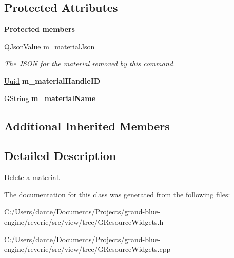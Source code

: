 \subsection*{Protected Attributes}
\begin{Indent}\textbf{ Protected members}\par
\begin{DoxyCompactItemize}
\item 
\mbox{\label{classrev_1_1_delete_material_command_a8ec58d542cc2692e4de29fd7f6003577}} 
Q\+Json\+Value \mbox{\hyperlink{classrev_1_1_delete_material_command_a8ec58d542cc2692e4de29fd7f6003577}{m\+\_\+material\+Json}}
\begin{DoxyCompactList}\small\item\em The J\+S\+ON for the material removed by this command. \end{DoxyCompactList}\item 
\mbox{\label{classrev_1_1_delete_material_command_a3a77dfb478ac09b3854703185af647e9}} 
\mbox{\hyperlink{classrev_1_1_uuid}{Uuid}} {\bfseries m\+\_\+material\+Handle\+ID}
\item 
\mbox{\label{classrev_1_1_delete_material_command_ac6d99f6c1402426de1770ff2e5aae688}} 
\mbox{\hyperlink{classrev_1_1_g_string}{G\+String}} {\bfseries m\+\_\+material\+Name}
\end{DoxyCompactItemize}
\end{Indent}
\subsection*{Additional Inherited Members}


\subsection{Detailed Description}
Delete a material. 

The documentation for this class was generated from the following files\+:\begin{DoxyCompactItemize}
\item 
C\+:/\+Users/dante/\+Documents/\+Projects/grand-\/blue-\/engine/reverie/src/view/tree/G\+Resource\+Widgets.\+h\item 
C\+:/\+Users/dante/\+Documents/\+Projects/grand-\/blue-\/engine/reverie/src/view/tree/G\+Resource\+Widgets.\+cpp\end{DoxyCompactItemize}
